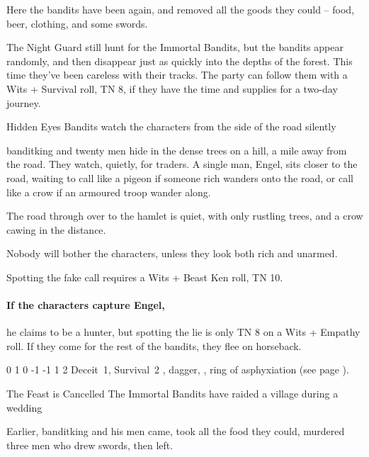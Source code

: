 \begin{multicols}{2}
Here the bandits have been again, and removed all the goods they could -- food, beer, clothing, and some swords.

The Night Guard still hunt for the Immortal Bandits, but the bandits appear randomly, and then disappear just as quickly into the depths of the forest.
This time they've been careless with their tracks.
The party can follow them with a Wits + Survival roll, TN 8, if they have the time and supplies for a two-day journey.

{Hidden Eyes}%
{Bandits watch the characters from the side of the road silently}%

\gls{banditking} and twenty men hide in the dense trees on a hill, a mile away from the road.
They watch, quietly, for traders.
A single man, Engel, sits closer to the road, waiting to call like a pigeon if someone rich wanders onto the road, or call like a crow if an armoured troop wander along.

\begin{boxtext}

	The road through over to the hamlet is quiet, with only rustling trees, and a crow cawing in the distance.

\end{boxtext}

Nobody will bother the characters, unless they look both rich and unarmed.

Spotting the fake call requires a Wits + Beast Ken roll, TN 10.

\paragraph{If the characters capture Engel,}
he claims to be a hunter, but spotting the lie is only TN 8 on a Wits + Empathy roll.
If they come for the rest of the bandits, they flee on horseback.


{0}%
{1}%
{{0}%
{-1}%
{-1}}%
{1}%
{2}%
{Deceit~1, Survival~2}%
{\shortsword, dagger, \partialleather, ring of asphyxiation (see page \pageref{ring_asphyxiation}).}%
{}

{The Feast is Cancelled}%
{The Immortal Bandits have raided a village during a wedding}%

Earlier, \gls{banditking} and his men came, took all the food they could, murdered three men who drew swords, then left.


\end{multicols}
